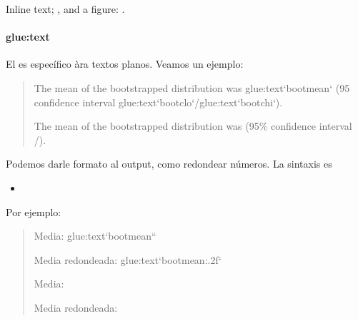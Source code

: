 \documentclass[letterpaper,10pt,english]{jupyterBook}
\begin{document}
\sphinxAtStartPar
In\sphinxhyphen{}line text; , and a figure: .


\paragraph{glue:text}
\label{\detokenize{docs/01_01_Code_Blocks:glue-text}}
\sphinxAtStartPar
El  es específico àra textos planos. Veamos un ejemplo:
\begin{quote}

\begin{sphinxVerbatim}[commandchars=\\\{\}]
The mean of the bootstrapped distribution was \PYGZob{}glue:text\PYGZcb{}`boot\PYGZus{}mean` (95\PYGZpc{} confidence interval \PYGZob{}glue:text\PYGZcb{}`boot\PYGZus{}clo`/\PYGZob{}glue:text\PYGZcb{}`boot\PYGZus{}chi`).
\end{sphinxVerbatim}

\sphinxAtStartPar
The mean of the bootstrapped distribution was  (95\% confidence interval /).
\end{quote}

\sphinxAtStartPar
Podemos darle formato al output, como redondear números. La sintaxis es
\begin{itemize}
\item {} 
\sphinxAtStartPar
{}

\end{itemize}

\sphinxAtStartPar
Por ejemplo:
\begin{quote}

\begin{sphinxVerbatim}[commandchars=\\\{\}]
Media: \PYGZob{}glue:text\PYGZcb{}`boot\PYGZus{}mean``

Media redondeada: \PYGZob{}glue:text\PYGZcb{}`boot\PYGZus{}mean:.2f`
\end{sphinxVerbatim}

\sphinxAtStartPar
Media: 

\sphinxAtStartPar
Media redondeada: 
\end{quote}
\end{document}
